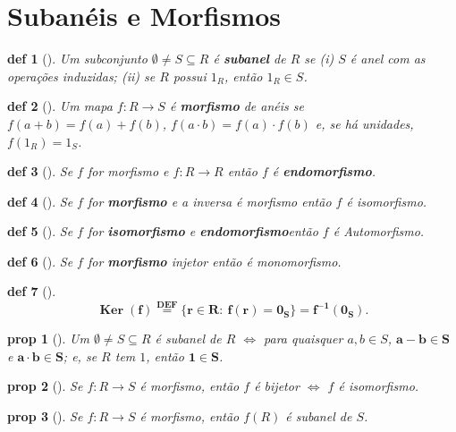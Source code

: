 \documentclass[11pt]{article}
\DeclareMathOperator{\Ker}{Ker}   %
\newcommand{\defname}[1]{\colorbox{yellow!30}{\strut \textbf{#1}}}
\newtheorem*{proposition}{prop}
\newtheorem*{definition}{def}
\theoremstyle{definition}
\begin{document}
\section{Subanéis e Morfismos}
\begin{multicols}{3}


\begin{definition}[\defname{Subanel}]
Um subconjunto \(\emptyset\neq S\subseteq R\) é \textbf{subanel} de \(R\) se (i) $S$ é anel com as operações induzidas; (ii) se $R$ possui $1_R$, então \(1_R\in S\).
\end{definition}

\begin{definition}[\defname{Morfismo (Homomorfismo) de Anéis}]
Um mapa \(f:R\to S\) é \textbf{morfismo} de anéis se
\(f(a+b)=f(a)+f(b)\),
\(f(a\cdot b)=f(a)\cdot f(b)\) e, se há unidades, \(f(1_R)=1_S\).
\end{definition}

\begin{definition}[\defname{Endomorfismo}]
Se $f$ for morfismo e \(f:R \to R\) então $f$ é \textbf{endomorfismo}. 
\end{definition}
\begin{definition}[\defname{Isomorfismo}]
Se $f$ for \textbf{morfismo} e a inversa é morfismo então $f$ é isomorfismo. 
\end{definition}
\begin{definition}[\defname{Automorfismo}]
Se $f$ for \textbf{isomorfismo} e \textbf{endomorfismo}então $f$ é Automorfismo. 
\end{definition}
\begin{definition}[\defname{Monomorfismo}]
Se $f$ for \textbf{morfismo} injetor então é monomorfismo. 
\end{definition}
\begin{definition}[\defname{Núcleo de um Morfismo}]
\[
\mathbf{\Ker(f)\stackrel{\text{DEF}}{=}\{r\in R:\ f(r)=0_S\}=f^{-1}(0_S)}.
\]
\end{definition}

\begin{proposition}[\defname{Caracterização de Subanel}]
Um \(\emptyset\neq S\subseteq R\) é subanel de \(R\) \(\iff\) para quaisquer \(a,b\in S\), \(\mathbf{a-b\in S}\) e \(\mathbf{a\cdot b\in S}\); e, se $R$ tem $1$, então \(\mathbf{1\in S}\).
\end{proposition}

\begin{proposition}[\defname{Morfismo Bijetor é Isomorfismo}]
Se \(f:R\to S\) é morfismo, então \(f\) é bijetor \(\iff\) \(f\) é isomorfismo.
\end{proposition}

\begin{proposition}[\defname{Imagem de anel é subanel}]
    Se \(f:R\to S\) é morfismo, então \(f(R)\) é subanel de $S$.
\end{proposition}

\end{multicols}
\end{document}
